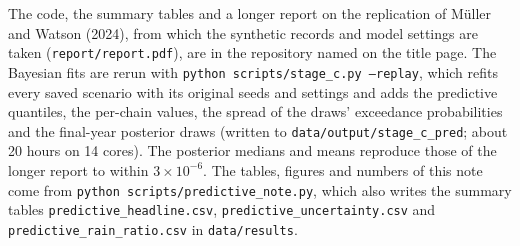 \documentclass[11pt]{article}
\begin{document}
{\sloppy
The code, the summary tables and a longer report on the replication of M\"uller and Watson
(2024), from which the synthetic records and model settings are taken (\texttt{report/report.pdf}),
are in the repository named on the title page. The Bayesian fits are rerun with \texttt{python scripts/stage\_c.py --replay}, which refits every
saved scenario with its original seeds and settings and adds the predictive quantiles, the
per-chain values, the spread of the draws' exceedance probabilities and the final-year posterior
draws (written to \texttt{data/output/stage\_c\_pred}; about 20 hours on 14 cores). The posterior
medians and means reproduce those of the longer report to within $3\times10^{-6}$. The tables, figures and
numbers of this note come from \texttt{python scripts/predictive\_note.py}, which also writes the
summary tables \texttt{predictive\_headline.csv}, \texttt{predictive\_uncertainty.csv} and
\texttt{predictive\_rain\_ratio.csv} in \texttt{data/results}.\par}
\end{document}
